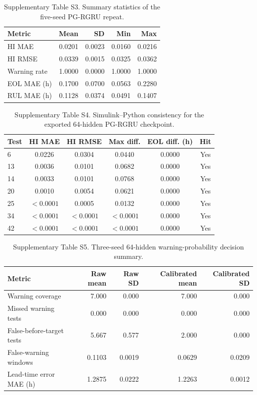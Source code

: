 \documentclass[preprint,12pt]{elsarticle}
\begin{document}
\begin{table}[htbp]
\centering
\footnotesize
\caption{Supplementary Table S3. Summary statistics of the five-seed PG-RGRU repeat.}
\begin{tabular}{@{}lrrrr@{}}
\toprule
Metric & Mean & SD & Min & Max \\
\midrule
HI MAE & 0.0201 & 0.0023 & 0.0160 & 0.0216 \\
HI RMSE & 0.0339 & 0.0015 & 0.0325 & 0.0362 \\
Warning rate & 1.0000 & 0.0000 & 1.0000 & 1.0000 \\
EOL MAE (h) & 0.1700 & 0.0700 & 0.0563 & 0.2280 \\
RUL MAE (h) & 0.1128 & 0.0374 & 0.0491 & 0.1407 \\
\bottomrule
\end{tabular}
\end{table}

\begin{table}[htbp]
\centering
\footnotesize
\caption{Supplementary Table S4. Simulink--Python consistency for the exported 64-hidden PG-RGRU checkpoint.}
\begin{tabular}{@{}lccccc@{}}
\toprule
Test & HI MAE & HI RMSE & Max diff. & EOL diff. (h) & Hit \\
\midrule
6 & 0.0226 & 0.0304 & 0.0440 & 0.0000 & Yes \\
13 & 0.0036 & 0.0101 & 0.0682 & 0.0000 & Yes \\
14 & 0.0033 & 0.0101 & 0.0768 & 0.0000 & Yes \\
20 & 0.0010 & 0.0054 & 0.0621 & 0.0000 & Yes \\
25 & $<0.0001$ & 0.0005 & 0.0132 & 0.0000 & Yes \\
34 & $<0.0001$ & $<0.0001$ & $<0.0001$ & 0.0000 & Yes \\
42 & $<0.0001$ & $<0.0001$ & $<0.0001$ & 0.0000 & Yes \\
\bottomrule
\end{tabular}
\end{table}

\begin{table}[htbp]
\centering
\footnotesize
\caption{Supplementary Table S5. Three-seed 64-hidden warning-probability decision summary.}
\begin{tabular}{@{}lrrrr@{}}
\toprule
Metric & Raw mean & Raw SD & Calibrated mean & Calibrated SD \\
\midrule
Warning coverage & 7.000 & 0.000 & 7.000 & 0.000 \\
Missed warning tests & 0.000 & 0.000 & 0.000 & 0.000 \\
False-before-target tests & 5.667 & 0.577 & 2.000 & 0.000 \\
False-warning windows & 0.1103 & 0.0019 & 0.0629 & 0.0209 \\
Lead-time error MAE (h) & 1.2875 & 0.0222 & 1.2263 & 0.0012 \\
\bottomrule
\end{tabular}
\end{table}
\end{document}
